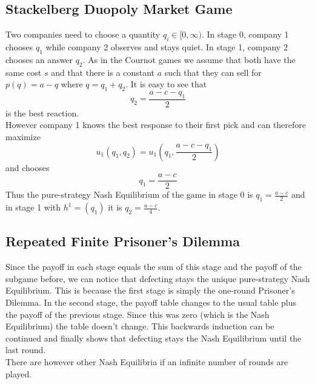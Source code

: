 \documentclass[a4paper, 12pt]{article}
\theoremstyle{plain}
\theoremstyle{definition}
\theoremstyle{lemma}
\theoremstyle{remark}
\theoremstyle{corollary}
\theoremstyle{example}
\begin{document}
	\subsection{Stackelberg Duopoly Market Game}
	Two companies need to choose a quantity $q_i \in [0,\infty)$. In stage 0, company 1 chooses $q_1$ while company 2 observes and stays quiet. In stage 1, company 2 chooses an answer $q_2$. As in the Cournot games we assume that both have the same cost $s$ and that there is a constant $a$ such that they can sell for $p(q) = a-q$ where $q = q_1+q_2$. It is easy to see that \[q_2 = \frac{a-c-q_1}{2}\] is the best reaction.\\
	However company 1 knows the best response to their first pick and can therefore maximize \[u_1(q_1,q_2) = u_1(q_1,\frac{a-c-q_1}{2})\] and chooses \[q_1 = \frac{a-c}{2}\]
	Thus the pure-strategy Nash Equilibrium of the game in stage 0 is $q_1 = \frac{a-c}{2}$ and in stage 1 with $h^1 = (q_1)$ it is $q_2 = \frac{a-c}{4}$.
	\subsection{Repeated Finite Prisoner's Dilemma}
	Since the payoff in each stage equals the sum of this stage and the payoff of the subgame before, we can notice that defecting stays the unique pure-strategy Nash Equilibrium. This is because the first stage is simply the one-round Prisoner's Dilemma. In the second stage, the payoff table changes to the usual table plus the payoff of the previous stage. Since this was zero (which is the Nash Equilibrium) the table doesn't change. This backwards induction can be continued and finally shows that defecting stays the Nash Equilibrium until the last round.\\
	There are however other Nash Equilibria if an infinite number of rounds are played.
\end{document}
